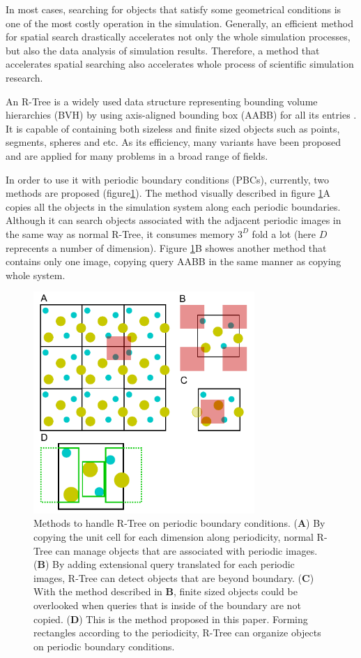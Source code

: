 \documentclass[10pt,letterpaper,twocolumn]{article}
\begin{document}
In most cases, searching for objects that satisfy some geometrical conditions
is one of the most costly operation in the simulation. Generally, an efficient
method for spatial search drastically accelerates not only the whole simulation
processes, but also the data analysis of simulation results. Therefore, a method
that accelerates spatial searching also accelerates whole process of scientific
simulation research.

An R-Tree is a widely used data structure representing bounding volume
hierarchies (BVH) by using axis-aligned bounding box (AABB) for all its entries
\cite{Guttman1984}. It is capable of containing both sizeless and finite sized
objects such as points, segments, spheres and etc. As its efficiency, many
variants have been proposed and are applied for many problems in a broad range
of fields.

In order to use it with periodic boundary conditions (PBCs), currently,
two methods are proposed (figure\ref{fig1})\cite{CoSTR-R-tree2016}.
The method visually described in
figure \ref{fig1}A copies all the objects in the simulation system
along each periodic boundaries. Although it can search objects associated with
the adjacent periodic images in the same way as normal R-Tree, it consumes
memory $3^D$ fold a lot (here $D$ reprecents a number of dimension). Figure
\ref{fig1}B showes another method that contains only one image,
copying query AABB in the same manner as copying whole system.

\begin{figure}[hbt]
    \includegraphics[width=8.4cm, bb=6 3 220 224]{fig1.eps}
    \caption{Methods to handle R-Tree on periodic boundary conditions.
    (\textbf{A})
    By copying the unit cell for each dimension along periodicity, normal R-Tree
    can manage objects that are associated with periodic images.
    (\textbf{B})
    By adding extensional query translated for each periodic images, R-Tree can
    detect objects that are beyond boundary.
    (\textbf{C})
    With the method described in \textbf{B}, finite sized objects could be
    overlooked when queries that is inside of the boundary are not copied.
    (\textbf{D})
    This is the method proposed in this paper. Forming rectangles according to
    the periodicity, R-Tree can organize objects on periodic boundary
    conditions.}
    \label{fig1}
\end{figure}
\end{document}

